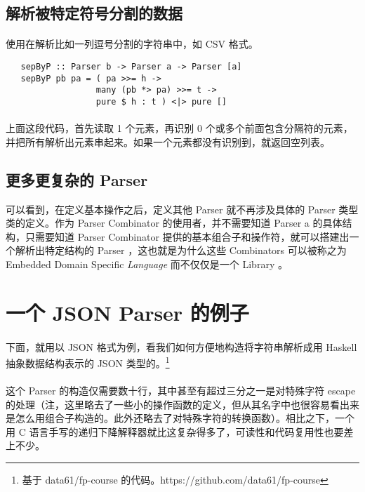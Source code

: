 \documentclass{article}
\begin{document}
  \subsection{解析被特定符号分割的数据}
   \paragraph{}
    使用在解析比如一列逗号分割的字符串中，如 CSV 格式。
   \begin{lstlisting}
   sepByP :: Parser b -> Parser a -> Parser [a]
   sepByP pb pa = ( pa >>= h ->
                  many (pb *> pa) >>= t ->
                  pure $ h : t ) <|> pure []
   \end{lstlisting}  
   \paragraph{}
    上面这段代码，首先读取 1 个元素，再识别 0 个或多个前面包含分隔符的元素，并把所有解析出元素串起来。如果一个元素都没有识别到，就返回空列表。
  \subsection{更多更复杂的 Parser }
   可以看到，在定义基本操作之后，定义其他 Parser 就不再涉及具体的 Parser 类型类的定义。作为 Parser Combinator 的使用者，并不需要知道 Parser a 的具体结构，只需要知道 Parser Combinator 提供的基本组合子和操作符，就可以搭建出一个解析出特定结构的 Parser ，这也就是为什么这些 Combinators 可以被称之为 Embedded Domain Specific \textit{Language} 而不仅仅是一个 Library 。
 \section{一个 JSON Parser 的例子}
   \paragraph{}
    下面，就用以 JSON 格式为例，看我们如何方便地构造将字符串解析成用 Haskell 抽象数据结构表示的 JSON 类型的。\footnote{基于 data61/fp-course 的代码。https://github.com/data61/fp-course}
   
   \paragraph{}
    这个 Parser 的构造仅需要数十行，其中甚至有超过三分之一是对特殊字符 escape 的处理（注，这里略去了一些小的操作函数的定义，但从其名字中也很容易看出来是怎么用组合子构造的。此外还略去了对特殊字符的转换函数）。相比之下，一个用 C 语言手写的递归下降解释器就比这复杂得多了，可读性和代码复用性也要差上不少。
\end{document}
